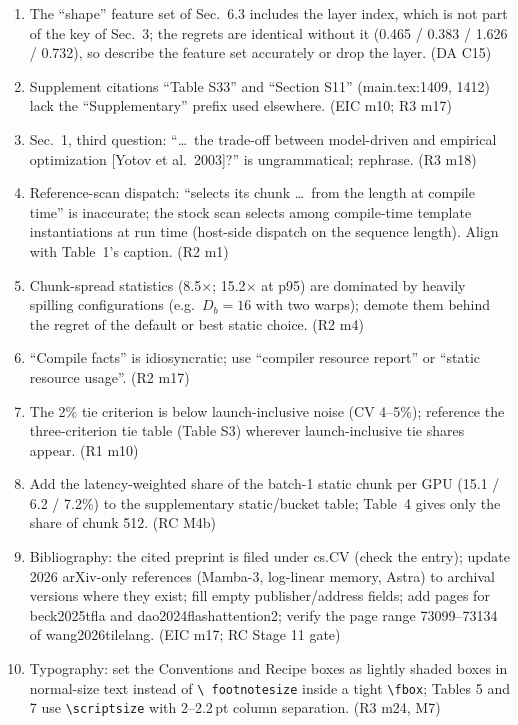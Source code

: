 \documentclass[11pt]{article}
\begin{document}
\begin{enumerate}[label=N\arabic*.]
        model'' (main.tex:1194) refers to three prompts, while S11 shows
        2.6--4.7\% of 192 prompts diverging for fixed alternative Mamba-1
        chunks in fp16; add ``on these three prompts''. (RC further
        observations)
  \item The ``shape'' feature set of Sec.~6.3 includes the layer index, which
        is not part of the key of Sec.~3; the regrets are identical without it
        (0.465 / 0.383 / 1.626 / 0.732), so describe the feature set
        accurately or drop the layer. (DA C15)
  \item Supplement citations ``Table S33'' and ``Section S11''
        (main.tex:1409, 1412) lack the ``Supplementary'' prefix used
        elsewhere. (EIC m10; R3 m17)
  \item Sec.~1, third question: ``\ldots\ the trade-off between model-driven
        and empirical optimization [Yotov et al.\ 2003]?'' is ungrammatical;
        rephrase. (R3 m18)
  \item Reference-scan dispatch: ``selects its chunk \ldots\ from the length
        at compile time'' is inaccurate; the stock scan selects among
        compile-time template instantiations at run time (host-side dispatch
        on the sequence length). Align with Table~1's caption. (R2 m1)
  \item Chunk-spread statistics (8.5$\times$; 15.2$\times$ at p95) are
        dominated by heavily spilling configurations (e.g.\ $D_b=16$ with two
        warps); demote them behind the regret of the default or best static
        choice. (R2 m4)
  \item ``Compile facts'' is idiosyncratic; use ``compiler resource report''
        or ``static resource usage''. (R2 m17)
  \item The 2\% tie criterion is below launch-inclusive noise (CV 4--5\%);
        reference the three-criterion tie table (Table S3) wherever
        launch-inclusive tie shares appear. (R1 m10)
  \item Add the latency-weighted share of the batch-1 static chunk per GPU
        (15.1 / 6.2 / 7.2\%) to the supplementary static/bucket table; Table~4
        gives only the share of chunk 512. (RC M4b)
  \item Bibliography: the cited preprint is filed under cs.CV (check the
        entry); update 2026 arXiv-only references (Mamba-3, log-linear memory,
        Astra) to archival versions where they exist; fill empty
        publisher/address fields; add pages for beck2025tfla and
        dao2024flashattention2; verify the page range 73099--73134 of
        wang2026tilelang. (EIC m17; RC Stage 11 gate)
  \item Typography: set the Conventions and Recipe boxes as lightly shaded
        boxes in normal-size text instead of \texttt{\textbackslash
        footnotesize} inside a tight \texttt{\textbackslash fbox}; Tables 5
        and 7 use \texttt{\textbackslash scriptsize} with 2--2.2\,pt column
        separation. (R3 m24, M7)
\end{enumerate}
\end{document}
